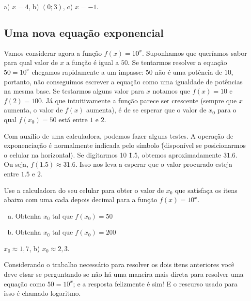 \documentclass[main.tex]{subfiles}
\begin{document}
\begin{gabarito}
	\begin{gabaritoQuestao}
		a) $x=4$, b) $(0;3)$, c) $x=-1$.
	\end{gabaritoQuestao}
\end{gabarito}

\subsection*{Uma nova equação exponencial}

Vamos considerar agora a função $f(x)=10^x$. Suponhamos que queríamos sabor para qual valor de $x$ a função é igual a $50$. Se tentarmos resolver a equação $50=10^x$ chegamos rapidamente a um impasse: $50$ não é uma potência de $10$, portanto, não conseguimos escrever a equação como uma igualdade de potências na mesma base. Se testarmos alguns valor para $x$ notamos que $f(x)=10$ e $f(2)=100$. Já que intuitivamente a função parece ser crescente (sempre que $x$ aumenta, o valor de $f(x)$ aumenta), é de se esperar que o valor de $x_0$ para o qual $f(x_0)=50$ está entre $1$ e $2$.

Com auxílio de uma calculadora, podemos fazer alguns testes. A operação de exponenciação é normalmente indicada pelo símbolo \^ (disponível se posicionarmos o celular na horizontal). Se digitarmos 10 \^ 1.5, obtemos aproximadamente $31.6$. Ou seja, $f(1.5) \approx 31.6$. Isso nos leva a esperar que o valor procurado esteja entre $1.5$ e $2$.

\begin{questao}
Use a calculadora do seu celular para obter o valor de $x_0$ que satisfaça os itens abaixo com uma cada depois decimal para a função $f(x)=10^x$.
\begin{enumerate}[a)]
\item Obtenha $x_0$ tal que $f(x_0)=50$
\item Obtenha $x_0$ tal que $f(x_0)=200$
\end{enumerate}
\end{questao}

\begin{gabarito}
	\begin{gabaritoQuestao}
		$x_0 \approx 1,7$, b) $x_0 \approx 2,3$.
	\end{gabaritoQuestao}
\end{gabarito}


Considerando o trabalho necessário para resolver os dois itens anteriores você deve etsar se perguntando se não há uma maneira mais direta para resolver uma equação como $50=10^x$; e a resposta felizmente é sim! E o rescurso usado para isso é chamado logaritmo.
\end{document}
